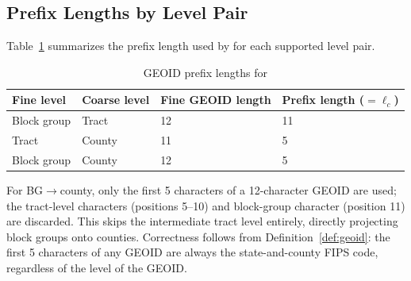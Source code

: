 \subsection{Prefix Lengths by Level Pair}

Table~\ref{tab:prefix} summarizes the prefix length used by \derive{}
for each supported level pair.

\begin{table}[h]
\centering
\caption{GEOID prefix lengths for \derive{}}
\label{tab:prefix}
\begin{tabular}{llll}
\toprule
Fine level & Coarse level & Fine GEOID length & Prefix length ($= \ell_c$) \\
\midrule
Block group & Tract  & 12 & 11 \\
Tract       & County & 11 & 5  \\
Block group & County & 12 & 5  \\
\bottomrule
\end{tabular}
\end{table}

\noindent
For BG$\to$county, only the first 5 characters of a 12-character GEOID
are used; the tract-level characters (positions 5--10) and block-group
character (position 11) are discarded.
This skips the intermediate tract level entirely, directly projecting block
groups onto counties.
Correctness follows from Definition~\ref{def:geoid}: the first 5 characters
of any GEOID are always the state-and-county FIPS code, regardless of the
level of the GEOID.
